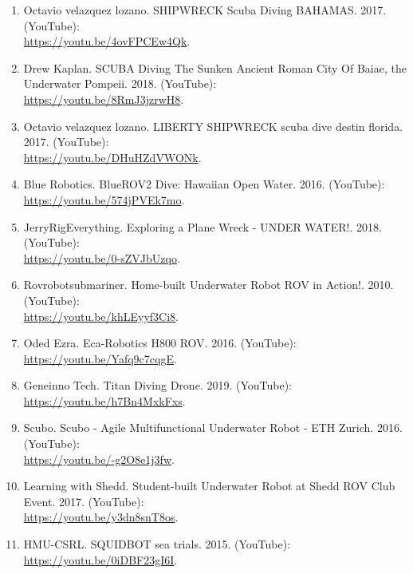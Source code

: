 \documentclass[10pt,twocolumn,letterpaper]{article}
\begin{document}
{\begin{enumerate}
    \item Octavio velazquez lozano. SHIPWRECK Scuba Diving BAHAMAS. 2017. (YouTube):\\
    \url{https://youtu.be/4ovFPCEw4Qk}.
    
    \item Drew Kaplan. SCUBA Diving The Sunken Ancient Roman City Of Baiae, the Underwater Pompeii. 2018. (YouTube): \\
    \url{https://youtu.be/8RmJ3jzrwH8}.
    
    \item Octavio velazquez lozano. LIBERTY SHIPWRECK scuba dive destin florida. 2017. (YouTube): \\
    \url{https://youtu.be/DHuHZdVWONk}.
    
    \item Blue Robotics. BlueROV2 Dive: Hawaiian Open Water. 2016. (YouTube): \\
    \url{https://youtu.be/574jPVEk7mo}.
    
    \item JerryRigEverything. Exploring a Plane Wreck - UNDER WATER!. 2018. (YouTube): \\
    \url{https://youtu.be/0-sZVJbUzqo}.
    
\item Rovrobotsubmariner. Home-built Underwater Robot ROV in Action!. 2010. (YouTube): \\
    \url{https://youtu.be/khLEyyf3Ci8}.
    
    \item Oded Ezra. Eca-Robotics H800 ROV. 2016. (YouTube): \\
    \url{https://youtu.be/Yafq9c7cqgE}.
    
    \item Geneinno Tech. Titan Diving Drone. 2019. (YouTube): \\
    \url{https://youtu.be/h7Bn4MxkFxs}.
    
    \item Scubo. Scubo - Agile Multifunctional Underwater Robot - ETH Zurich. 2016. (YouTube): \\
    \url{https://youtu.be/-g2O8e1j3fw}.
    
    \item Learning with Shedd. Student-built Underwater Robot at Shedd ROV Club Event. 2017. (YouTube): \\
    \url{https://youtu.be/y3dn8snT8os}.
    
    \item HMU-CSRL. SQUIDBOT sea trials. 2015. (YouTube): \\
    \url{https://youtu.be/0iDBF23gI6I}. 
    

\end{enumerate}}
\end{document}
